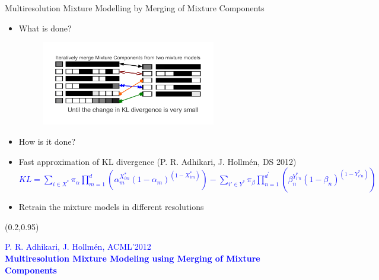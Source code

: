\documentclass[first=dgreen,second=purple,logo=redexc]{aaltoslides}
\newcommand\FrameText[1]{%
  \begin{textblock*}{0.98\textwidth}(0.2\textwidth,0.95\textheight)
    \textcolor {blue}{\scriptsize\raggedright #1\hspace{0.1\textwidth}}
  \end{textblock*}}
\begin{document}
\begin{frame}{Multiresolution Mixture Modelling by Merging of Mixture Components}

\begin{itemize}
\scriptsize \item What is done?
\vspace{-1mm}
\begin{figure}
\centering
  \includegraphics[trim=1.2cm 0cm 0cm 1cm, clip=true,width=0.72\textwidth]{figures/idasecondpage}
\end{figure}
\vspace{-7mm}
\scriptsize\item How is it done?
\scriptsize \item Fast approximation of KL divergence (P. R. Adhikari, J. Hollm\'en, DS 2012) \\ %
\scriptsize
\textcolor{blue} {$KL  =  \displaystyle \sum_{i \in X^{*}} \pi_{\alpha} \displaystyle
\prod _{m=1}^{{d}}
\left(\alpha_m^{X^{*}_{im}}(1-\alpha_{m})^{(1-X^{*}_{im})} \right) -
\displaystyle \sum_{i{\prime} \in Y^{*}} \pi_{\beta} \displaystyle \prod
_{n=1}^{{d^{\prime}}} \left(
\beta_{n}^{Y^{*}_{i{\prime}n}}(1-\beta_{n})^{(1-Y^{*}_{i{\prime}n})} \right)
$}
\scriptsize \item Retrain the mixture models in different resolutions
\end{itemize}
\FrameText{P. R. Adhikari, J. Hollm{\'e}n, ACML'2012 \\ \vspace{-2mm} \textbf{Multiresolution Mixture Modeling using Merging of Mixture Components}}
\end{frame}
\end{document}
